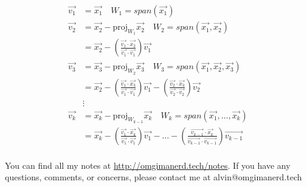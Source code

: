 \documentclass{math}
\begin{document}
\begin{align*}
  \vec{v_1} &= \vec{x_1} \quad W_1 = span(\vec{x_1}) \\
  \vec{v_2} &= \vec{x_2}-\text{proj}_{W_1}\vec{x_2} \quad
    W_2 = span(\vec{x_1},\vec{x_2}) \\
  &= \vec{x_2}-
    \left(\frac{\vec{v_1}\cdot\vec{x_2}}{\vec{v_1}\cdot\vec{v_1}}\right)
    \vec{v_1} \\
  \vec{v_3} &= \vec{x_3}-\text{proj}_{W_2}\vec{x_3} \quad
    W_3 = span(\vec{x_1},\vec{x_2},\vec{x_3}) \\
  &= \vec{x_2}-
    \left(\frac{\vec{v_1}\cdot\vec{x_3}}{\vec{v_1}\cdot\vec{v_1}}\right)
    \vec{v_1}-
    \left(\frac{\vec{v_2}\cdot\vec{x_3}}{\vec{v_2}\cdot\vec{v_2}}\right)
    \vec{v_2} \\
  &\vdots \\
  \vec{v_k} &= \vec{x_k}-\text{proj}_{W_{k-1}}\vec{x_k} \quad
    W_k = span(\vec{x_1},\dots,\vec{x_k}) \\
  &= \vec{x_k}-
    \left(\frac{\vec{v_1}\cdot\vec{x_k}}{\vec{v_1}\cdot\vec{v_1}}\right)
    \vec{v_1}-\dots-
    \left(\frac{\vec{v_{k-1}}\cdot\vec{x_k}}{\vec{v_{k-1}}\cdot\vec{v_{k-1}}}
    \right)\vec{v_{k-1}} \\
\end{align*}

\begin{center}
  You can find all my notes at \url{http://omgimanerd.tech/notes}. If you have
  any questions, comments, or concerns, please contact me at
  alvin@omgimanerd.tech
\end{center}
\end{document}

